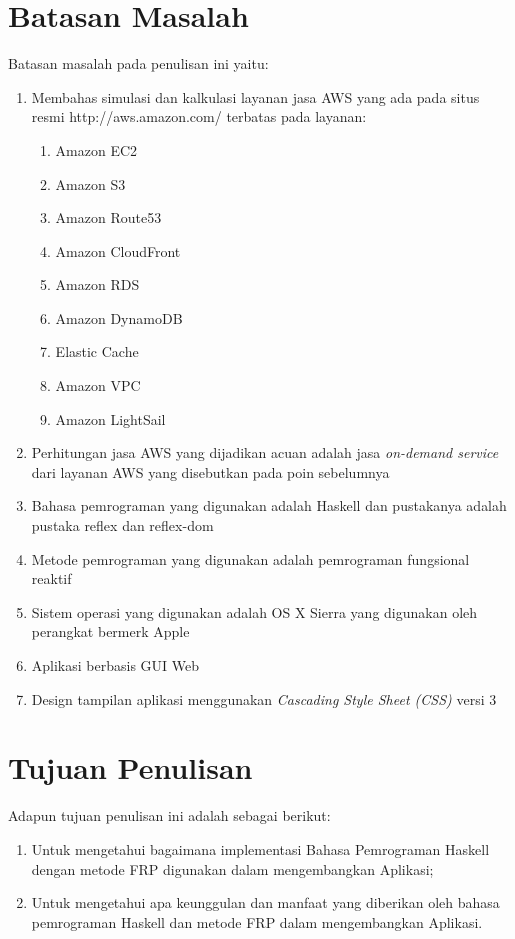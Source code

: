\documentclass[pi.tex]{subfile}
\begin{document}
\section{Batasan Masalah}
Batasan masalah pada penulisan ini yaitu:
\begin{enumerate}
  \item Membahas simulasi dan kalkulasi layanan jasa AWS yang ada pada situs resmi http://aws.amazon.com/ terbatas pada layanan:
    \begin{enumerate}
      
    \item Amazon EC2
    \item Amazon S3
    \item Amazon Route53
    \item Amazon CloudFront
    \item Amazon RDS
    \item Amazon DynamoDB
    \item Elastic Cache
    \item Amazon VPC
    \item Amazon LightSail
      
    \end{enumerate}
    \item Perhitungan jasa AWS yang dijadikan acuan adalah jasa \emph{on-demand service} dari layanan AWS yang disebutkan pada poin sebelumnya
  \item Bahasa pemrograman yang digunakan adalah Haskell dan pustakanya adalah pustaka reflex dan reflex-dom
  \item Metode pemrograman yang digunakan adalah pemrograman fungsional reaktif
  \item Sistem operasi yang digunakan adalah OS X Sierra yang digunakan oleh perangkat bermerk Apple
  \item Aplikasi berbasis GUI Web
  \item Design tampilan aplikasi menggunakan \emph{Cascading Style Sheet (CSS)} versi 3
    
    
\end{enumerate}

\section{Tujuan Penulisan}
Adapun tujuan penulisan ini adalah sebagai berikut:
\begin{enumerate}
  \item Untuk mengetahui bagaimana implementasi Bahasa Pemrograman Haskell dengan metode FRP digunakan dalam mengembangkan Aplikasi;
  \item Untuk mengetahui apa keunggulan dan manfaat yang diberikan oleh bahasa pemrograman Haskell dan metode FRP dalam mengembangkan Aplikasi.
\end{enumerate}
\end{document}
